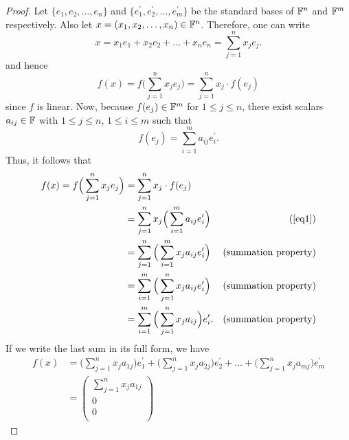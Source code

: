 \begin{proof}
    Let $\{e_{1}, e_{2}, \dots, e_{n}\}$ and $\{e_{1}^{\prime}, e_{2}^{\prime}, \dots, e_{m}^{\prime}\}$
    be the standard bases of $\mathbb{F}^{n}$ and $\mathbb{F}^{m}$ respectively. Also let
    $x = (x_{1}, x_{2}, \dots, x_{n}) \in \mathbb{F}^{n}$. Therefore, one can write
    \[
        x = x_{1} e_{1} + x_{2} e_{2} + \dots + x_{n} e_{n} = \sum_{j=1}^{n} x_{j} e_{j}.
    \]
    and hence
    \[
        f(x) = f\Big(\sum_{j=1}^{n} x_{j} e_{j} \Big) = \sum_{j=1}^{n} x_{j} \cdot f(e_{j})
    \]
    since $f$ is linear. Now, because $f(e_{j}) \in \mathbb{F}^{m}$ for $1 \leq j \leq n$,
    there exist scalars $a_{ij} \in \mathbb{F}$ with $1 \leq j \leq n$, $1 \leq i \leq m$
    such that
    \begin{equation} \label{eq1}
        f(e_{j}) = \sum_{i=1}^{m} a_{ij} e_{i}^{\prime}.
    \end{equation}
    Thus, it follows that
    \begin{align*}
        f(x) = f\Big(\sum_{j=1}^{n} x_{j} e_{j} \Big) &= \sum_{j=1}^{n} x_{j} \cdot f(e_{j}) \\
                                                      &= \sum_{j=1}^{n} x_{j} \Big(\sum_{i=1}^{m} a_{ij} e_{i}^{\prime}\Big)   &\text{(\cref{eq1})} \\
                                                      &= \sum_{j=1}^{n} \Big(\sum_{i=1}^{m} x_{j} a_{ij} e_{i}^{\prime}\Big)   &\text{(summation property)} \\
                                                      &= \sum_{i=1}^{m} \Big(\sum_{j=1}^{n} x_{j} a_{ij} e_{i}^{\prime}\Big)   &\text{(summation property)} \\
                                                      &= \sum_{i=1}^{m} \Big(\sum_{j=1}^{n} x_{j} a_{ij} \Big) e_{i}^{\prime}. &\text{(summation property)}
    \end{align*}
    If we write the last sum in its full form, we have
    \begin{align*}
        f(x) &= \Big(\sum_{j=1}^{n} x_{j} a_{1j}\Big) e_{1}^{\prime} 
              + \Big(\sum_{j=1}^{n} x_{j} a_{2j}\Big) e_{2}^{\prime} 
              + \dots + \Big(\sum_{j=1}^{n} x_{j} a_{mj}\Big) e_{m}^{\prime} \\
             &= \begin{pmatrix}
                    \sum_{j=1}^{n} x_{j} a_{1j} \\
                    0 \\
                    0 \\

\end{pmatrix}
\end{align*}
\end{proof}
